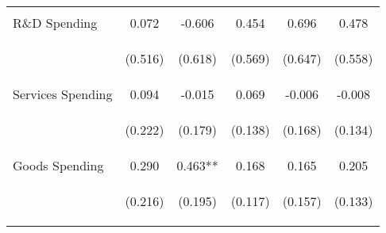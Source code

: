 \begin{tabular}{lccccc}
    \vspace{-2pt} & \vspace{-2pt} & \vspace{-2pt} & \vspace{-2pt} & \vspace{-2pt} \\ \hline
    \vspace{-1.5pt} & \vspace{-1.5pt} & \vspace{-1.5pt} & \vspace{-1.5pt} & \vspace{-1.5pt} \\
    R\&D Spending & 0.072 & -0.606 & 0.454 & 0.696 & 0.478 \\
    & \begin{footnotesize}(0.516)\end{footnotesize} & \begin{footnotesize}(0.618)\end{footnotesize} & \begin{footnotesize}(0.569)\end{footnotesize} & \begin{footnotesize}(0.647)\end{footnotesize} & \begin{footnotesize}(0.558)\end{footnotesize} \\
    Services Spending & 0.094 & -0.015 & 0.069 & -0.006 & -0.008 \\
    & \begin{footnotesize}(0.222)\end{footnotesize} & \begin{footnotesize}(0.179)\end{footnotesize} & \begin{footnotesize}(0.138)\end{footnotesize} & \begin{footnotesize}(0.168)\end{footnotesize} & \begin{footnotesize}(0.134)\end{footnotesize} \\
    Goods Spending & 0.290 & 0.463** & 0.168 & 0.165 & 0.205 \\
    & \begin{footnotesize}(0.216)\end{footnotesize} & \begin{footnotesize}(0.195)\end{footnotesize} & \begin{footnotesize}(0.117)\end{footnotesize} & \begin{footnotesize}(0.157)\end{footnotesize} & \begin{footnotesize}(0.133)\end{footnotesize} \\


\end{tabular}
